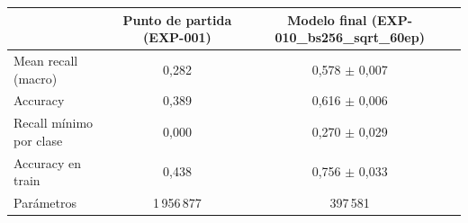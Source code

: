 \begin{tabular}{lcc}
\toprule
 & Punto de partida (EXP-001) & Modelo final (EXP-010\_bs256\_sqrt\_60ep) \\
\midrule
Mean recall (macro) & 0,282 & 0,578 $\pm$ 0,007 \\
Accuracy & 0,389 & 0,616 $\pm$ 0,006 \\
Recall mínimo por clase & 0,000 & 0,270 $\pm$ 0,029 \\
Accuracy en train & 0,438 & 0,756 $\pm$ 0,033 \\
Parámetros & 1\,956\,877 & 397\,581 \\
\bottomrule
\end{tabular}
